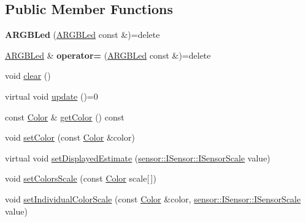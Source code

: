 \subsection*{Public Member Functions}
\begin{DoxyCompactItemize}
\item 
\mbox{\label{classathome_1_1display_1_1_a_r_g_b_led_ac4556a22050f3a1beff3134977f72589}} 
{\bfseries A\+R\+G\+B\+Led} (\mbox{\hyperlink{classathome_1_1display_1_1_a_r_g_b_led}{A\+R\+G\+B\+Led}} const \&)=delete
\item 
\mbox{\label{classathome_1_1display_1_1_a_r_g_b_led_a8ff479add175bb3a99426301c2db87ce}} 
\mbox{\hyperlink{classathome_1_1display_1_1_a_r_g_b_led}{A\+R\+G\+B\+Led}} \& {\bfseries operator=} (\mbox{\hyperlink{classathome_1_1display_1_1_a_r_g_b_led}{A\+R\+G\+B\+Led}} const \&)=delete
\item 
void \mbox{\hyperlink{classathome_1_1display_1_1_a_r_g_b_led_a9753e3a23ea5cb6b0a41079bc6128766}{clear}} ()
\item 
virtual void \mbox{\hyperlink{classathome_1_1display_1_1_a_r_g_b_led_a725ceca0c01735daa9c95148baf075ab}{update}} ()=0
\item 
const \mbox{\hyperlink{structathome_1_1display_1_1_a_r_g_b_led_1_1_color}{Color}} \& \mbox{\hyperlink{classathome_1_1display_1_1_a_r_g_b_led_a2c3022a5aad43595fefc4b52d916467a}{get\+Color}} () const
\item 
void \mbox{\hyperlink{classathome_1_1display_1_1_a_r_g_b_led_a7ca4858c1ee10cc2f7c1dcc11a6d050e}{set\+Color}} (const \mbox{\hyperlink{structathome_1_1display_1_1_a_r_g_b_led_1_1_color}{Color}} \&color)
\item 
virtual void \mbox{\hyperlink{classathome_1_1display_1_1_a_r_g_b_led_a1e6a934912f71a5ea06df1d28cf5ace9}{set\+Displayed\+Estimate}} (\mbox{\hyperlink{classathome_1_1sensor_1_1_i_sensor_aa70bc27a4c17c86caf96cca776541ddf}{sensor\+::\+I\+Sensor\+::\+I\+Sensor\+Scale}} value)
\item 
void \mbox{\hyperlink{classathome_1_1display_1_1_a_r_g_b_led_a411b35199d593b813bad7d9056678198}{set\+Colors\+Scale}} (const \mbox{\hyperlink{structathome_1_1display_1_1_a_r_g_b_led_1_1_color}{Color}} scale\mbox{[}$\,$\mbox{]})
\item 
void \mbox{\hyperlink{classathome_1_1display_1_1_a_r_g_b_led_a69e31887e1a37a86073d5f82bd578f1f}{set\+Individual\+Color\+Scale}} (const \mbox{\hyperlink{structathome_1_1display_1_1_a_r_g_b_led_1_1_color}{Color}} \&color, \mbox{\hyperlink{classathome_1_1sensor_1_1_i_sensor_aa70bc27a4c17c86caf96cca776541ddf}{sensor\+::\+I\+Sensor\+::\+I\+Sensor\+Scale}} value)
\end{DoxyCompactItemize}


